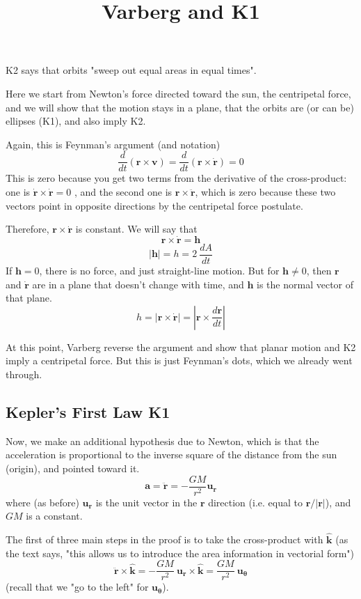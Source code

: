 \documentclass[11pt, oneside]{article}   	%
\title{Varberg and K1}
\date{}							%
\begin{document}
\maketitle
\Large

\noindent
K2 says that orbits "sweep out equal areas in equal times".

Here we start from Newton's force directed toward the sun, the centripetal force, and we will show that the motion stays in a plane, that the orbits are (or can be) ellipses (K1), and also imply K2.

Again, this is Feynman's argument (and notation)
\[ \frac{d}{dt} ( \mathbf{r} \times \mathbf{v}) = \frac{d}{dt} ( \mathbf{r} \times \dot{\mathbf{r}}) = 0 \]
This is zero because you get two terms from the derivative of the cross-product:  one is $\dot{\mathbf{r}} \times \dot{\mathbf{r}} = 0$ , and the second one is $\mathbf{r} \times \ddot{\mathbf{r}}$, which is zero because these two vectors point in opposite directions by the centripetal force postulate.

Therefore,  $\mathbf{r} \times \dot{\mathbf{r}}$ is constant.  We will say that
\[ \mathbf{r} \times \dot{\mathbf{r}} = \mathbf{h} \]
\[ |\mathbf{h}| = h = 2 \ \frac{dA}{dt} \]
If $\mathbf{h} = 0$, there is no force, and just straight-line motion.  But for  $\mathbf{h} \ne 0$, then $\mathbf{r}$ and $\dot{\mathbf{r}}$ are in a plane that doesn't change with time, and $\mathbf{h}$ is the normal vector of that plane.
\[ h = | \mathbf{r} \times \dot{\mathbf{r}} | = |\mathbf{r} \times \frac{d\mathbf{r}}{dt} | \]

At this point, Varberg reverse the argument and show that planar motion and K2 imply a centripetal force.  But this is just Feynman's dots, which we already went through.

\subsection*{Kepler's First Law K1}
Now, we make an additional hypothesis due to Newton, which is that the acceleration is proportional to the inverse square of the distance from the sun (origin), and pointed toward it.
\[ \mathbf{a} = \ddot{\mathbf{r}} = - \frac{GM}{r^2} \mathbf{u_r} \]
where (as before) $\mathbf{u_r}$ is the unit vector in the $\mathbf{r}$ direction (i.e. equal to $\mathbf{r}/|\mathbf{r}|$), and $GM$ is a constant.

The first of three main steps in the proof is to take the cross-product with $\hat{\mathbf{k}}$ (as the text says, "this allows us to introduce the area information in vectorial form")
\[ \ddot{\mathbf{r}} \times \hat{\mathbf{k}} = - \frac{GM}{r^2} \ \mathbf{u_r} \times \hat{\mathbf{k}} = \frac{GM}{r^2} \ \mathbf{u_\theta} \]
(recall that we "go to the left" for $\mathbf{u_\theta}$).  
\end{document}
